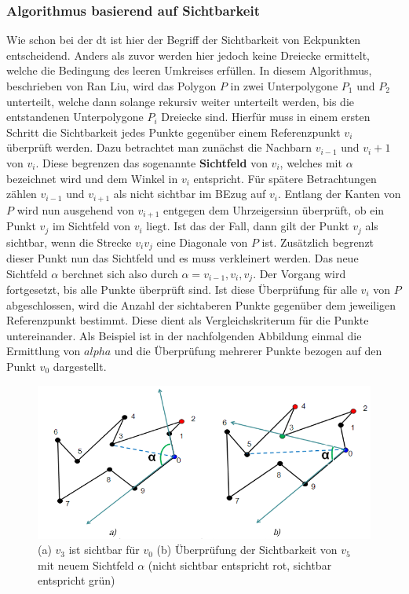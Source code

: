 \subsubsection{Algorithmus basierend auf Sichtbarkeit}

Wie schon bei der \ac{dt} ist hier der Begriff der Sichtbarkeit von Eckpunkten entscheidend. Anders als zuvor werden hier jedoch keine Dreiecke ermittelt,
welche die Bedingung des leeren Umkreises erfüllen. In diesem Algorithmus, beschrieben von Ran Liu, wird das Polygon $P$ in zwei Unterpolygone $P_1$ und $P_2$ unterteilt,
welche dann solange rekursiv weiter unterteilt werden, bis die entstandenen Unterpolygone $P_i$ Dreiecke sind.\cite{newAlg}
Hierfür muss in einem ersten Schritt die Sichtbarkeit jedes Punkte gegenüber einem Referenzpunkt $v_i$ überprüft werden. Dazu betrachtet man zunächst die Nachbarn $v_{i-1}$ und $v_i+1$ 
von $v_i$. Diese begrenzen das sogenannte \textbf{Sichtfeld} von $v_i$, welches mit $\alpha$ bezeichnet wird und dem Winkel in $v_i$ entspricht. Für spätere Betrachtungen zählen $v_{i-1}$ und $v_{i+1}$ 
als nicht sichtbar im BEzug auf $v_i$. Entlang der Kanten von $P$ wird nun ausgehend von $v_{i+1}$ entgegen dem Uhrzeigersinn überprüft, ob ein Punkt $v_j$ im Sichtfeld von $v_i$ liegt.
Ist das der Fall, dann gilt der Punkt $v_j$ als sichtbar, wenn die Strecke $v_iv_j$ eine Diagonale von $P$ ist. Zusätzlich begrenzt dieser Punkt nun das Sichtfeld und es muss verkleinert werden. Das neue Sichtfeld $\alpha$ berchnet sich also durch $\alpha = v_{i-1},v_i,v_j$.
Der Vorgang wird fortgesetzt, bis alle Punkte überprüft sind. Ist diese Überprüfung für alle $v_i$ von $P$ abgeschlossen, wird die Anzahl der sichtaberen Punkte 
gegenüber dem jeweiligen Referenzpunkt bestimmt. Diese dient als Vergleichskriterum für die Punkte untereinander. Als Beispiel ist in der nachfolgenden Abbildung einmal die Ermittlung von $alpha$ und die Überprüfung 
mehrerer Punkte bezogen auf den Punkt $v_0$ dargestellt. 

\begin{figure}[h]
\centering
\includegraphics[width=1\textwidth]{bilder/sichtbarkeit.png}
\caption[Sichtbarkeit von Punkten]{\centering(a) $v_3$ ist sichtbar für $v_0$ (b) Überprüfung der Sichtbarkeit von $v_5$ mit neuem Sichtfeld $\alpha$ (nicht sichtbar entspricht rot, sichtbar entspricht grün) \cite{newAlg} }
\label{fig:visibPoint}
\end{figure}

